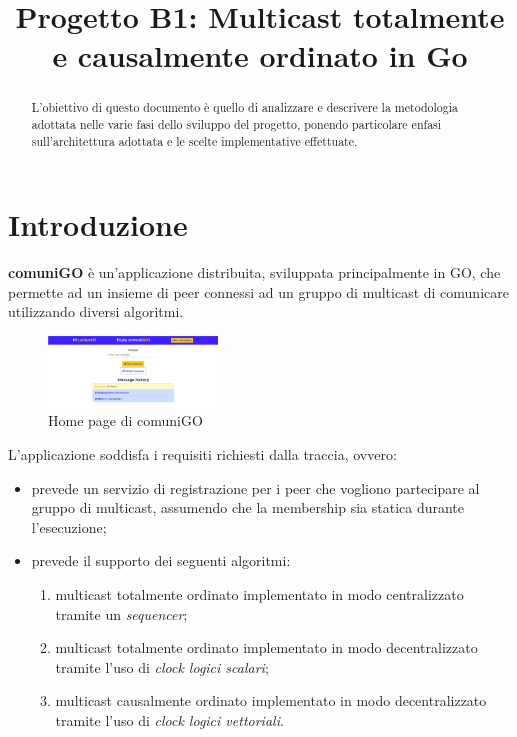 \documentclass[conference]{IEEEtran}
\begin{document}
\title{Progetto B1: Multicast totalmente e causalmente ordinato in Go}

\author{
}


\maketitle

\begin{abstract}
L'obiettivo di questo documento è quello di analizzare e descrivere la metodologia adottata nelle varie fasi dello sviluppo del progetto, ponendo particolare enfasi sull'architettura adottata e le scelte implementative effettuate. 
\end{abstract}

\section{Introduzione}
\textbf{comuniGO} è un'applicazione distribuita, sviluppata principalmente in GO, che permette ad un insieme di peer connessi ad un gruppo di multicast di comunicare utilizzando diversi algoritmi.

\begin{figure}[htbp]
\centerline{\includegraphics[width=0.4\textwidth]{figs/home.png}}
\caption{Home page di comuniGO}
\label{fig:home}
\end{figure}

L'applicazione soddisfa i requisiti richiesti dalla traccia, ovvero:
\begin{itemize}
\item prevede un servizio di registrazione per i peer che vogliono partecipare al gruppo di multicast, assumendo che la membership sia statica durante l'esecuzione;

\item prevede il supporto dei seguenti algoritmi:
\begin{enumerate}
\item multicast totalmente ordinato implementato in modo centralizzato tramite un \textsl{sequencer};

\item multicast totalmente ordinato implementato in modo decentralizzato tramite l'uso di \textsl{clock logici
scalari};

\item multicast causalmente ordinato implementato in modo decentralizzato tramite l'uso di \textsl{clock
logici vettoriali}.
\end{enumerate}
\end{itemize}
\end{document}
